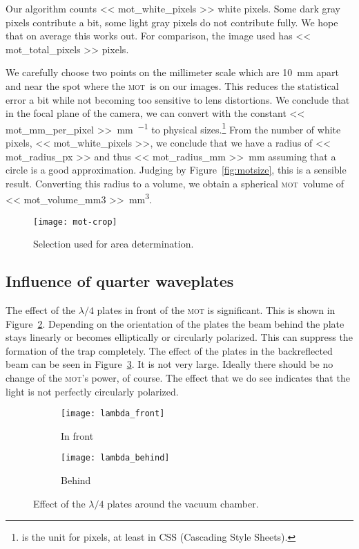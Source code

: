 \documentclass[11pt, english, fleqn, DIV=15, headinclude, BCOR=2cm]{scrreprt}
\newcommand\mot{\textsc{mot}}
\begin{document}
Our algorithm counts \num{<< mot_white_pixels >>} white pixels. Some dark gray
pixels contribute a bit, some light gray pixels do not contribute fully. We
hope that on average this works out. For comparison, the image used has \num{<<
mot_total_pixels >>} pixels.

We carefully choose two points on the millimeter scale which are
\SI{10}{\milli\meter} apart and near the spot where the \mot\ is on our images.
This reduces the statistical error a bit while not becoming too sensitive to
lens distortions. We conclude that in the focal plane of the camera, we can
convert with the constant \SI{<< mot_mm_per_pixel >>}{\milli\meter\per\pixel}
to physical sizes.\footnote{\si{\pixel} is the unit for pixels, at least in CSS
(Cascading Style Sheets).} From the number of white pixels, \num{<<
mot_white_pixels >>}, we conclude that we have a radius of \SI{<< mot_radius_px
>>}{\pixel} and thus \SI{<< mot_radius_mm >>}{\milli\meter} assuming that a
circle is a good approximation. Judging by Figure~\ref{fig:motsize}, this is a
sensible result. Converting this radius to a volume, we obtain a spherical
\mot\ volume of \SI{<< mot_volume_mm3 >>}{\milli\meter\cubed}.


\begin{figure}
    \centering
    \texttt{[image: mot-crop]}
    \caption{%
        Selection used for area determination.
    }
    \label{fig:mot-crop}
\end{figure}

\subsection{Influence of quarter waveplates}

The effect of the $\lambda/4$ plates in front of the \mot{} is significant.
This is shown in Figure~\ref{fig:lambda_front}. Depending on the orientation of
the plates the beam behind the plate stays linearly or becomes elliptically or
circularly polarized. This can suppress the formation of the trap completely.
The effect of the plates in the backreflected beam can be seen in
Figure~\ref{fig:lambda_behind}. It is not very large. Ideally there should be
no change of the \mot's power, of course. The effect that we do see indicates
that the light is not perfectly circularly polarized.

\begin{figure}
    \centering
    \begin{subfigure}[c]{0.48\linewidth}
    \centering
    \texttt{[image: lambda\_front]}
    \caption{%
        In front
    }
    \label{fig:lambda_front}
    \end{subfigure}
    \hfill
    \begin{subfigure}[c]{0.48\linewidth}
    \centering
    \texttt{[image: lambda\_behind]}
    \caption{%
        Behind
    }
    \label{fig:lambda_behind}
    \end{subfigure}
    \caption{%
        Effect of the $\lambda/4$ plates around the vacuum chamber.
    }
    \label{fig:}
\end{figure}
\end{document}

